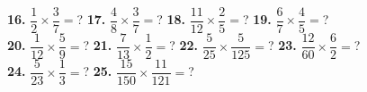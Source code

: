 \documentclass[a4paper]{article}
\begin{document}
\begin{Large}
\textbf{16.} $\dfrac{1}{2} \times \dfrac{3}{7} =$? \hspace{0.2cm}
\textbf{17.} $\dfrac{4}{8} \times \dfrac{3}{7} =$? \hspace{0.2cm}
\textbf{18.} $\dfrac{11}{12} \times \dfrac{2}{5} =$? \hspace{0.2cm}
\textbf{19.} $\dfrac{6}{7} \times \dfrac{4}{5} =$?  \\[0.75cm]
\textbf{20.} $\dfrac{1}{12} \times \dfrac{5}{9} =$? \hspace{0.2cm}
\textbf{21.} $\dfrac{7}{13} \times \dfrac{1}{2} =$? \hspace{0.2cm}
\textbf{22.} $\dfrac{5}{25} \times \dfrac{5}{125} =$? \hspace{0.2cm}
\textbf{23.} $\dfrac{12}{60} \times \dfrac{6}{2} =$?  \\[0.75cm]
\textbf{24.} $\dfrac{5}{23} \times \dfrac{1}{3} =$? \hspace{0.2cm}
\textbf{25.} $\dfrac{15}{150} \times \dfrac{11}{121} =$?


\end{Large}
\end{document}
